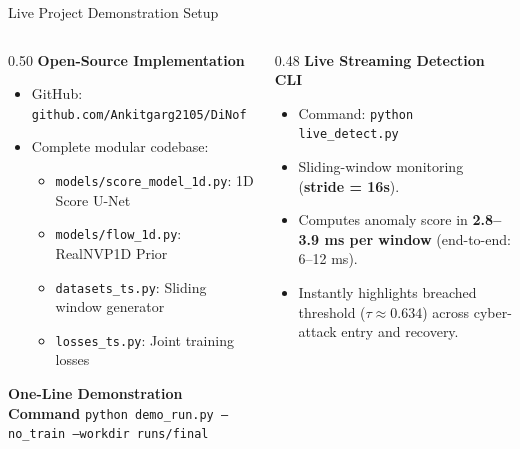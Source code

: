 \documentclass[aspectratio=169, 11pt]{beamer}
\begin{document}
\begin{frame}{Live Project Demonstration Setup}
\begin{columns}[T]
  \begin{column}{0.50\textwidth}
    \textbf{\large Open-Source Implementation}
    \begin{itemize}\itemsep=3pt
      \item GitHub: \texttt{github.com/Ankitgarg2105/DiNof}
      \item Complete modular codebase:
      \begin{itemize}\itemsep=1.5pt
        \footnotesize
        \item \texttt{models/score\_model\_1d.py}: 1D Score U-Net
        \item \texttt{models/flow\_1d.py}: RealNVP1D Prior
        \item \texttt{datasets\_ts.py}: Sliding window generator
        \item \texttt{losses\_ts.py}: Joint training losses
      \end{itemize}
    \end{itemize}
    \vspace{4pt}
    \begin{block}{\textbf{One-Line Demonstration Command}}
      \footnotesize \texttt{python demo\_run.py --no\_train --workdir runs/final}
    \end{block}
  \end{column}

  \begin{column}{0.48\textwidth}
    \textbf{\large Live Streaming Detection CLI}
    \begin{itemize}\itemsep=3pt
      \item Command: \texttt{python live\_detect.py}
      \item Sliding-window monitoring (\textbf{stride = 16s}).
      \item Computes anomaly score in \textbf{2.8--3.9 ms per window} (end-to-end: 6--12 ms).
      \item Instantly highlights breached threshold ($\tau \approx 0.634$) across cyber-attack entry and recovery.
    \end{itemize}
  \end{column}
\end{columns}
\end{frame}
\end{document}
